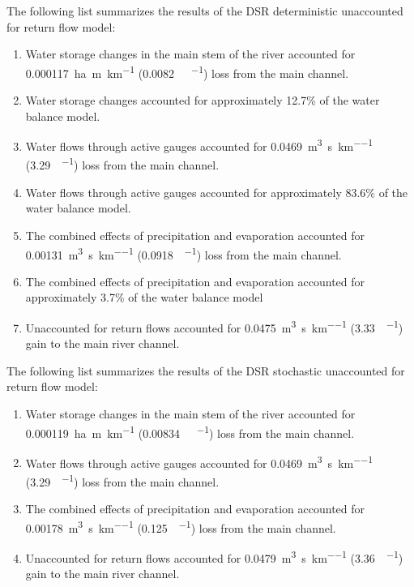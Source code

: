 \begin{linenumbers}
The following list summarizes the results of the DSR deterministic unaccounted for return flow model:
\begin{enumerate}
	\item Water storage changes in the main stem of the river accounted for \SI{0.000117}{\hectare\m\per\kilo\meter} (\SI{0.0082}{\acre\foot\per\mile}) loss from the main channel.
	\item Water storage changes accounted for approximately 12.7\% of the water balance model.
	\item Water flows through active gauges accounted for \SI{0.0469}{\cubic\m\per\second\per\kilo\meter} (\SI{3.29}{\cfs\per\mile}) loss from the main channel.
	\item Water flows through active gauges accounted for approximately 83.6\% of the water balance model.
	\item The combined effects of precipitation and evaporation accounted for \SI{0.00131}{\cubic\m\per\second\per\kilo\meter} (\SI{0.0918}{\cfs\per\mile}) loss from the main channel.
	\item The combined effects of precipitation and evaporation accounted for approximately 3.7\% of the water balance model
	\item Unaccounted for return flows accounted for \SI{0.0475}{\cubic\m\per\second\per\kilo\meter} (\SI{3.33}{\cfs\per\mile}) gain to the main river channel.
\end{enumerate}

The following list summarizes the results of the DSR stochastic unaccounted for return flow model:
\begin{enumerate}
	\item Water storage changes in the main stem of the river accounted for \SI{0.000119}{\hectare\m\per\kilo\meter} (\SI{0.00834}{\acre\foot\per\mile}) loss from the main channel.
	\item Water flows through active gauges accounted for \SI{0.0469}{\cubic\m\per\second\per\kilo\meter} (\SI{3.29}{\cfs\per\mile}) loss from the main channel.
	\item The combined effects of precipitation and evaporation accounted for \SI{0.00178}{\cubic\m\per\second\per\kilo\meter} (\SI{0.125}{\cfs\per\mile}) loss from the main channel.
	\item Unaccounted for return flows accounted for \SI{0.0479}{\cubic\m\per\second\per\kilo\meter} (\SI{3.36}{\cfs\per\mile}) gain to the main river channel.
\end{enumerate}


\end{linenumbers}
